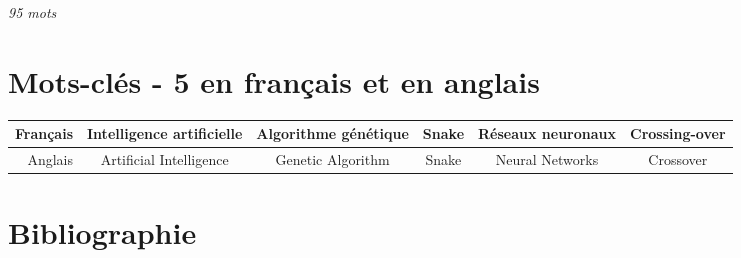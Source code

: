 \documentclass[11pt,a4paper]{article}
\begin{document}
\textit{95 mots}

\section{Mots-clés - 5 en français et en anglais}

\footnotesize
\begin{tabular}{||r|c|c|c|c|c||} \hline
	Français & Intelligence artificielle & Algorithme génétique & Snake & Réseaux neuronaux & Crossing-over \\ \hline \hline
	Anglais & Artificial Intelligence & Genetic Algorithm & Snake & Neural Networks & Crossover \\
		\hline
	\end{tabular}

\section{Bibliographie}



\end{document}
